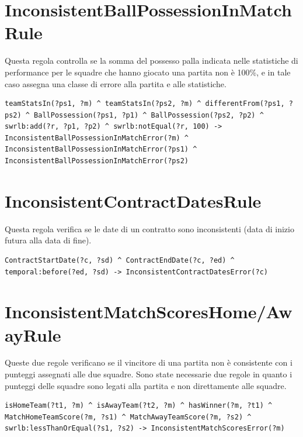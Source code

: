 \documentclass[11pt]{report} %
\begin{document}
\section{InconsistentBallPossessionInMatchRule}

Questa regola controlla se la somma del possesso palla indicata nelle statistiche di performance per le squadre che hanno giocato una partita non è 100\%, e in tale caso assegna una classe di errore alla partita e alle statistiche.

\begin{lstlisting}[language=SWRL]
teamStatsIn(?ps1, ?m) ^ teamStatsIn(?ps2, ?m) ^ differentFrom(?ps1, ?ps2) ^ BallPossession(?ps1, ?p1) ^ BallPossession(?ps2, ?p2) ^ swrlb:add(?r, ?p1, ?p2) ^ swrlb:notEqual(?r, 100) -> InconsistentBallPossessionInMatchError(?m) ^ InconsistentBallPossessionInMatchError(?ps1) ^ InconsistentBallPossessionInMatchError(?ps2)
\end{lstlisting}

\section{InconsistentContractDatesRule}

Questa regola verifica se le date di un contratto sono inconsistenti (data di inizio futura alla data di fine).

\begin{lstlisting}[language=SWRL]
ContractStartDate(?c, ?sd) ^ ContractEndDate(?c, ?ed) ^ temporal:before(?ed, ?sd) -> InconsistentContractDatesError(?c)
\end{lstlisting}

\section{InconsistentMatchScoresHome/AwayRule}

Queste due regole verificano se il vincitore di una partita non è consistente con i punteggi assegnati alle due squadre.
Sono state necessarie due regole in quanto i punteggi delle squadre sono legati alla partita e non direttamente alle squadre.

\begin{lstlisting}[language=SWRL]
isHomeTeam(?t1, ?m) ^ isAwayTeam(?t2, ?m) ^ hasWinner(?m, ?t1) ^ MatchHomeTeamScore(?m, ?s1) ^ MatchAwayTeamScore(?m, ?s2) ^ swrlb:lessThanOrEqual(?s1, ?s2) -> InconsistentMatchScoresError(?m)
\end{lstlisting}
\end{document}
